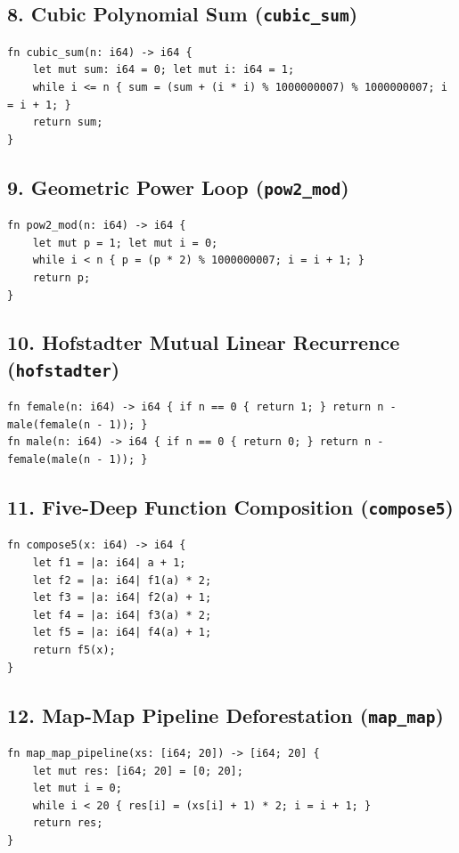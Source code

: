 \subsection{8. Cubic Polynomial Sum (\texttt{cubic\_sum})}
\begin{lstlisting}[language=NumLang, caption={NumLang Cubic Polynomial Sum (10M).}]
fn cubic_sum(n: i64) -> i64 {
    let mut sum: i64 = 0; let mut i: i64 = 1;
    while i <= n { sum = (sum + (i * i) % 1000000007) % 1000000007; i = i + 1; }
    return sum;
}
\end{lstlisting}

\subsection{9. Geometric Power Loop (\texttt{pow2\_mod})}
\begin{lstlisting}[language=NumLang, caption={NumLang Modular Power Accumulator (100).}]
fn pow2_mod(n: i64) -> i64 {
    let mut p = 1; let mut i = 0;
    while i < n { p = (p * 2) % 1000000007; i = i + 1; }
    return p;
}
\end{lstlisting}

\subsection{10. Hofstadter Mutual Linear Recurrence (\texttt{hofstadter})}
\begin{lstlisting}[language=NumLang, caption={NumLang Hofstadter Sequences.}]
fn female(n: i64) -> i64 { if n == 0 { return 1; } return n - male(female(n - 1)); }
fn male(n: i64) -> i64 { if n == 0 { return 0; } return n - female(male(n - 1)); }
\end{lstlisting}

\subsection{11. Five-Deep Function Composition (\texttt{compose5})}
\begin{lstlisting}[language=NumLang, caption={NumLang Five-Deep Closure Composition.}]
fn compose5(x: i64) -> i64 {
    let f1 = |a: i64| a + 1;
    let f2 = |a: i64| f1(a) * 2;
    let f3 = |a: i64| f2(a) + 1;
    let f4 = |a: i64| f3(a) * 2;
    let f5 = |a: i64| f4(a) + 1;
    return f5(x);
}
\end{lstlisting}

\subsection{12. Map-Map Pipeline Deforestation (\texttt{map\_map})}
\begin{lstlisting}[language=NumLang, caption={NumLang Map-Map Pipeline.}]
fn map_map_pipeline(xs: [i64; 20]) -> [i64; 20] {
    let mut res: [i64; 20] = [0; 20];
    let mut i = 0;
    while i < 20 { res[i] = (xs[i] + 1) * 2; i = i + 1; }
    return res;
}
\end{lstlisting}

